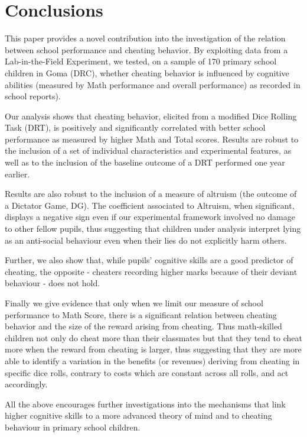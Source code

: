 \documentclass[authoryear, preprint, review, 12pt]{elsarticle}
\begin{document}
\section{Conclusions}
\label{sec:conclusion}
This paper provides a novel contribution into the investigation of the relation between school performance and cheating behavior. By exploiting data from a Lab-in-the-Field Experiment, we tested, on a sample of 170 primary school children in Goma (DRC), whether cheating behavior is influenced by cognitive abilities (measured by Math performance and overall performance) as recorded in school reports).  

Our analysis shows that cheating behavior, elicited from a modified Dice Rolling Task (DRT), is positively and significantly correlated with better school performance as measured by higher Math and Total scores. 
Results are robust to the inclusion of a set of individual characteristics and experimental features, as well as to the inclusion of the baseline outcome of a DRT performed one year earlier. 

Results are also robust to the inclusion of a measure of altruism (the outcome of a Dictator Game, DG). The coefficient associated to Altruism, when significant, displays a negative sign even if our experimental framework involved no damage to other fellow pupils, thus suggesting that children under analysis interpret lying as an anti-social behaviour even when their lies do not explicitly harm others.

Further, we also show that, while pupils' cognitive skills are a good predictor of cheating, the opposite - cheaters recording higher marks because of their deviant behaviour - does not hold. 

Finally we give evidence that only when we limit our measure of school performance to Math Score, there is a significant relation between cheating behavior and the size of the reward arising from cheating. Thus math-skilled children not only do cheat more than their classmates but that they tend to cheat more when the reward from cheating is larger, thus suggesting that they are more able to identify a variation in the benefits (or revenues) deriving from cheating in specific dice rolls, contrary to costs which are constant across all rolls, and act accordingly.   

All the above encourages further investigations into the mechanisms that link higher cognitive skills to a more advanced theory of mind and to cheating behaviour in primary school children.
\end{document}
